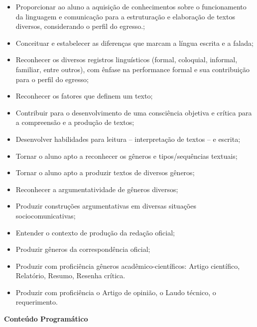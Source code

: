 \begin{itemize}

\item Proporcionar ao aluno a aquisição de conhecimentos sobre o funcionamento da linguagem e comunicação para a estruturação e elaboração de textos diversos, considerando o perfil do egresso.;
\item Conceituar e estabelecer as diferenças que marcam a língua escrita e a falada;
\item Reconhecer os diversos registros linguísticos (formal, coloquial, informal, familiar, entre outros), com ênfase na performance formal e sua contribuição para o perfil do egresso;
\item Reconhecer os fatores que definem um texto;
\item Contribuir para o desenvolvimento de uma consciência objetiva e crítica para a compreensão e a produção de textos;
\item Desenvolver habilidades para leitura – interpretação de textos – e escrita;
\item Tornar o aluno apto a reconhecer os gêneros e tipos/sequências textuais;
\item Tornar o aluno apto a produzir textos de diversos gêneros;
\item Reconhecer a argumentatividade de gêneros diversos;
\item Produzir construções argumentativas em diversas situações sociocomunicativas;
\item Entender o contexto de produção da redação oficial;
\item Produzir gêneros da correspondência oficial;
\item Produzir com proficiência gêneros acadêmico-científicos: Artigo científico, Relatório, Resumo, Resenha crítica.
\item Produzir com proficiência o Artigo de opinião, o Laudo técnico, o requerimento.

\end{itemize} 


\begin{snugshade}\begin{center}\textbf{
    Conteúdo Programático
}\end{center}\end{snugshade}

